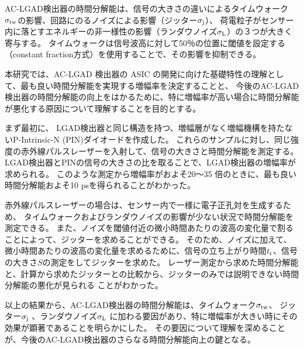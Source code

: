   AC-LGAD検出器の時間分解能は、信号の大きさの違いによるタイムウォーク$\sigma_{\rm{tw}}$の影響、回路にのるノイズによる影響（ジッター$\sigma_{\rm{j}}$）、
  荷電粒子がセンサー内に落とすエネルギーの非一様性の影響（ランダウノイズ$\sigma_{\rm{L}}$）の３つが大きく寄与する。
  タイムウォークは信号波高に対して50％の位置に閾値を設定する（constant fraction方式）を使用することで、その影響を抑制できる。
  
  本研究では、AC-LGAD 検出器の ASIC の開発に向けた基礎特性の理解として、最も良い時間分解能を実現する増幅率を決定することと、
  今後のAC-LGAD検出器の時間分解能の向上をはかるために、特に増幅率が高い場合に時間分解能が悪化する原因について理解することを目的とする。
  
  まず最初に、%
  LGAD検出器と同じ構造を持つ、増幅層がなく増幅機構を持たないP-Intrinsic-N (PIN)ダイオードを作成した。%
  これらのサンプルに対し、同じ強度の赤外線パルスレーザーを入射して、信号の大きさと時間分解能を測定する。
  LGAD検出器とPINの信号の大きさの比を取ることで、LGAD検出器の増幅率が求められる。
  このような測定から増幅率がおよそ20〜35 倍のときに、最も良い時間分解能およそ10 psを得られることがわかった。
  
  赤外線パルスレーザーの場合は、センサー内で一様に電子正孔対を生成するため、
  タイムウォークおよびランダウノイズの影響が少ない状況で時間分解能を測定できる。
  また、ノイズを閾値付近の微小時間あたりの波高の変化量で割ることによって、ジッターを求めることができる。
  そのため、ノイズに加えて、微小時間あたりの波高の変化量を求めるために、信号の立ち上がり時間$t_{\rm{r}}$、信号の大きさ$S$の測定をしてジッターを求めた。
  レーザー測定から求めた時間分解能と、計算から求めたジッターとの比較から、ジッターのみでは説明できない時間分解能の悪化が見られる
  ことがわかった。
  
  以上の結果から、AC-LGAD検出器の時間分解能は、タイムウォーク$\sigma_{\rm{tw}}$、
  ジッター$\sigma_{\rm{j}}$ 、ランダウノイズ$\sigma_{\rm{L}}$ に加わる要因があり、特に増幅率が大きい時にその効果が顕著であることを明らかにした。
  その要因について理解を深めることが、今後のAC-LGAD検出器のさらなる時間分解能向上の鍵となる。
  
